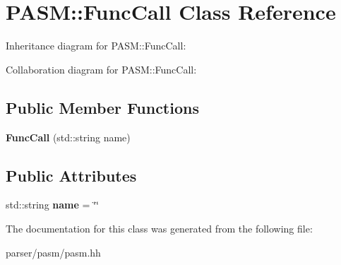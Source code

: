\hypertarget{classPASM_1_1FuncCall}{}\section{P\+A\+SM\+:\+:Func\+Call Class Reference}
\label{classPASM_1_1FuncCall}


Inheritance diagram for P\+A\+SM\+:\+:Func\+Call\+:


Collaboration diagram for P\+A\+SM\+:\+:Func\+Call\+:
\subsection*{Public Member Functions}
\begin{DoxyCompactItemize}
\item 
\mbox{\label{classPASM_1_1FuncCall_a892301dc841f66969742be97cbfe0b14}} 
{\bfseries Func\+Call} (std\+::string name)
\end{DoxyCompactItemize}
\subsection*{Public Attributes}
\begin{DoxyCompactItemize}
\item 
\mbox{\label{classPASM_1_1FuncCall_a8d477e9c0730966920782bb0758cd22f}} 
std\+::string {\bfseries name} = \char`\"{}\char`\"{}
\end{DoxyCompactItemize}


The documentation for this class was generated from the following file\+:\begin{DoxyCompactItemize}
\item 
parser/pasm/pasm.\+hh\end{DoxyCompactItemize}

